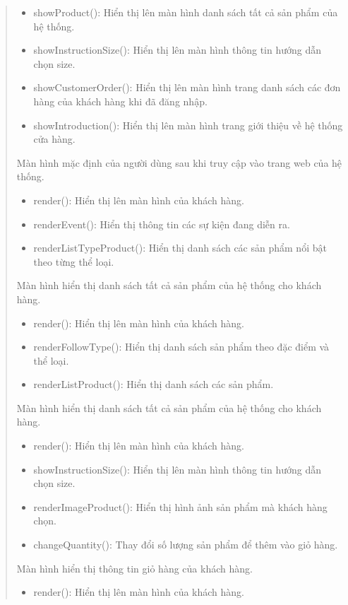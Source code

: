 \begin{quote}
\begin{itemize}
			\item showProduct(): Hiển thị lên màn hình danh sách tất cả sản phẩm của hệ thống.
			\item showInstructionSize(): Hiển thị lên màn hình thông tin hướng dẫn chọn size.
			\item showCustomerOrder(): Hiển thị lên màn hình trang danh sách các đơn hàng của khách hàng khi đã đăng nhập.
			\item showIntroduction(): Hiển thị lên màn hình trang giới thiệu về hệ thống cửa hàng.
		\end{itemize}
		Màn hình mặc định của người dùng sau khi truy cập vào trang web của hệ thống.
		\begin{itemize}
			\item render(): Hiển thị lên màn hình của khách hàng.
			\item renderEvent(): Hiển thị thông tin các sự kiện đang diễn ra.
			\item renderListTypeProduct(): Hiển thị danh sách các sản phẩm nổi bật theo từng thể loại.
		\end{itemize}
		Màn hình hiển thị danh sách tất cả sản phẩm của hệ thống cho khách hàng.
		\begin{itemize}
			\item render(): Hiển thị lên màn hình của khách hàng.
			\item renderFollowType(): Hiển thị danh sách sản phẩm theo đặc điểm và thể loại.
			\item renderListProduct(): Hiển thị danh sách các sản phẩm.
		\end{itemize}
		 Màn hình hiển thị danh sách tất cả sản phẩm của hệ thống cho khách hàng.
		\begin{itemize}
			\item render(): Hiển thị lên màn hình của khách hàng.
			\item showInstructionSize(): Hiển thị lên màn hình thông tin hướng dẫn chọn size.
			\item renderImageProduct(): Hiển thị hình ảnh sản phẩm mà khách hàng chọn.
			\item changeQuantity(): Thay đổi số lượng sản phẩm để thêm vào giỏ hàng.
		\end{itemize}
		Màn hình hiển thị thông tin giỏ hàng của khách hàng.
		\begin{itemize}
			\item render(): Hiển thị lên màn hình của khách hàng.

\end{itemize}
\end{quote}
